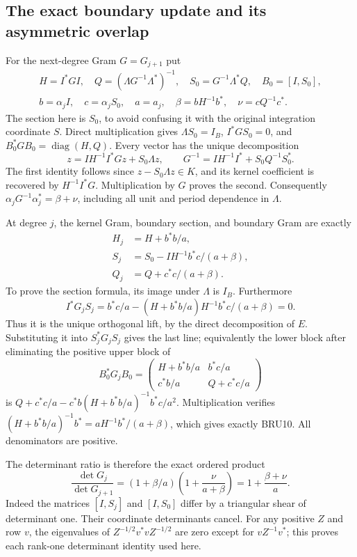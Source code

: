 \documentclass[11pt,a4paper]{article}
\begin{document}
\subsection{The exact boundary update and its asymmetric overlap}

For the next-degree Gram $G=G_{j+1}$ put
\[
 \begin{gathered}
 H=I^*GI,\quad Q=(\Lambda G^{-1}\Lambda^*)^{-1},\quad
 S_0=G^{-1}\Lambda^*Q,\quad B_0=[I,S_0],\\
 b=\alpha_j I,\quad c=\alpha_jS_0,\quad a=a_j,\quad
 \beta=bH^{-1}b^*,\quad \nu=cQ^{-1}c^*.
 \end{gathered}\tag{BRU8}
\]
The section here is $S_0$, to avoid confusing it with the original
integration coordinate $S$. Direct multiplication gives
$\Lambda S_0=I_B$, $I^*GS_0=0$, and
$B_0^*GB_0=\operatorname{diag}(H,Q)$. Every vector has the unique
decomposition
\[
 z=I H^{-1}I^*Gz+S_0\Lambda z,
 \qquad G^{-1}=IH^{-1}I^*+S_0Q^{-1}S_0^*.
 \tag{BRU9}
\]
The first identity follows since $z-S_0\Lambda z\in K$, and its
kernel coefficient is recovered by $H^{-1}I^*G$. Multiplication
by $G$ proves the second. Consequently
$\alpha_jG^{-1}\alpha_j^*=\beta+\nu$, including all unit and
period dependence in $\Lambda$.

At degree $j$, the kernel Gram, boundary section, and boundary Gram
are exactly
\[
 \boxed{\begin{aligned}
 H_j&=H+b^*b/a,\\
 S_j&=S_0-IH^{-1}b^*c/(a+\beta),\\
 Q_j&=Q+c^*c/(a+\beta).
 \end{aligned}}\tag{BRU10}
\]
To prove the section formula, its image under $\Lambda$ is $I_B$.
Furthermore
\[
 I^*G_jS_j=b^*c/a-(H+b^*b/a)H^{-1}b^*c/(a+\beta)=0.
\]
Thus it is the unique orthogonal lift, by the direct decomposition
of $E$. Substituting it into $S_j^*G_jS_j$ gives the last line;
equivalently the lower block after eliminating the positive upper
block of
\[
 B_0^*G_jB_0=
 \begin{pmatrix}H+b^*b/a&b^*c/a\\c^*b/a&Q+c^*c/a\end{pmatrix}
\]
is $Q+c^*c/a-c^*b(H+b^*b/a)^{-1}b^*c/a^2$.
Multiplication verifies
$(H+b^*b/a)^{-1}b^*=aH^{-1}b^*/(a+\beta)$,
which gives exactly BRU10. All denominators are positive.

The determinant ratio is therefore the exact ordered product
\[
 \boxed{\frac{\det G_j}{\det G_{j+1}}
 =(1+\beta/a)\left(1+\frac{\nu}{a+\beta}\right)
 =1+\frac{\beta+\nu}{a}.}\tag{BRU11}
\]
Indeed the matrices $[I,S_j]$ and $[I,S_0]$ differ by a triangular
shear of determinant one. Their coordinate determinants cancel.
For any positive $Z$ and row $v$, the eigenvalues of
$Z^{-1/2}v^*vZ^{-1/2}$ are zero except for $vZ^{-1}v^*$;
this proves each rank-one determinant identity used here.
\end{document}
